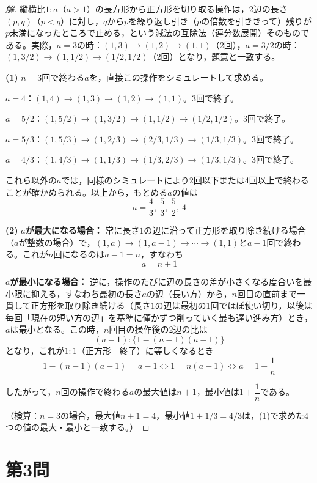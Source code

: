 \documentclass[../main.tex]{subfiles}
\begin{document}
\begin{proof}[解]
  縦横比$1:a$（$a>1$）の長方形から正方形を切り取る操作は，2辺の長さ$(p,q)$（$p<q$）に対し，$q$から$p$を繰り返し引き（$p$の倍数を引ききって）残りが$p$未満になったところで止める，という減法の互除法（連分数展開）そのものである。実際，$a=3$の時：$(1,3)\to(1,2)\to(1,1)$（2回），$a=3/2$の時：$(1,3/2)\to(1,1/2)\to(1/2,1/2)$（2回）となり，題意と一致する。

  \textbf{(1)} $n=3$回で終わる$a$を，直接この操作をシミュレートして求める。

  $a=4$：$(1,4)\to(1,3)\to(1,2)\to(1,1)$。3回で終了。

  $a=5/2$：$(1,5/2)\to(1,3/2)\to(1,1/2)\to(1/2,1/2)$。3回で終了。

  $a=5/3$：$(1,5/3)\to(1,2/3)\to(2/3,1/3)\to(1/3,1/3)$。3回で終了。

  $a=4/3$：$(1,4/3)\to(1,1/3)\to(1/3,2/3)\to(1/3,1/3)$。3回で終了。

  これら以外の$a$では，同様のシミュレートにより2回以下または4回以上で終わることが確かめられる。以上から，もとめる$a$の値は
  \[
    a=\frac43,\ \frac53,\ \frac52,\ 4
  \]

  \textbf{(2)} \textbf{$a$が最大になる場合：} 常に長さ$1$の辺に沿って正方形を取り除き続ける場合（$a$が整数の場合）で，$(1,a)\to(1,a-1)\to\cdots\to(1,1)$と$a-1$回で終わる。これが$n$回になるのは$a-1=n$，すなわち
  \[
    a=n+1
  \]

  \textbf{$a$が最小になる場合：} 逆に，操作のたびに辺の長さの差が小さくなる度合いを最小限に抑える，すなわち最初の長さ$a$の辺（長い方）から，$n$回目の直前まで一貫して正方形を取り除き続ける（長さ$1$の辺は最初の1回でほぼ使い切り，以後は毎回「現在の短い方の辺」を基準に僅かずつ削っていく最も遅い進み方）とき，$a$は最小となる。この時，$n$回目の操作後の2辺の比は
  \[
    (a-1):\{1-(n-1)(a-1)\}
  \]
  となり，これが$1:1$（正方形＝終了）に等しくなるとき
  \[
    1-(n-1)(a-1)=a-1 \iff 1=n(a-1) \iff a=1+\frac1n
  \]

  したがって，$n$回の操作で終わる$a$の最大値は$n+1$，最小値は$1+\dfrac1n$である。

  （検算：$n=3$の場合，最大値$n+1=4$，最小値$1+1/3=4/3$は，(1)で求めた4つの値の最大・最小と一致する。）
\end{proof}

\newpage

\section*{第3問}
\end{document}
